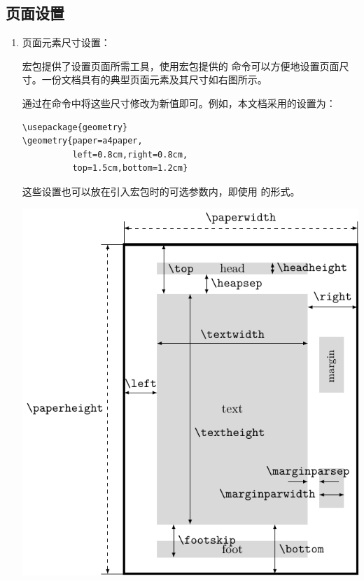 \subsection{页面设置}
\begin{enumerate}

\item 页面元素尺寸设置：

\begin{tcolorbox}[sidebyside, colback=white, parbox=false]

 宏包提供了设置页面所需工具，使用宏包提供的 \boxforcmd{\\geometry{}} 命令可以方便地设置页面尺寸。一份文档具有的典型页面元素及其尺寸如右图所示。

通过在命令中将这些尺寸修改为新值即可。例如，本文档采用的设置为：
\vspace{9pt}
\begin{lstlisting}[backgroundcolor = \color{gray!20},
                    xleftmargin = 5pt,
                    framexleftmargin = 5pt]
\usepackage{geometry}
\geometry{paper=a4paper,
          left=0.8cm,right=0.8cm,
          top=1.5cm,bottom=1.2cm}    
\end{lstlisting}
\vspace{9pt}
这些设置也可以放在引入宏包时的可选参数内，即使用 \boxforcmd{\\usepackage[...options...]{geometry}} 的形式。

\vfill

\mbox{}

\tcblower

\includegraphics[scale=0.8]{./resource/tikz/geometry.pdf}


\end{tcolorbox}
\end{enumerate}
